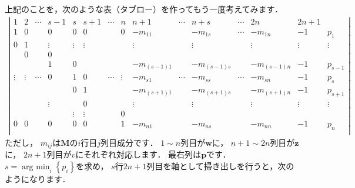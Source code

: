 \documentclass[a4paper]{jsarticle}
\begin{document}
上記のことを，次のような表（タブロー）を作ってもう一度考えてみます．
\begin{align*}
\left|\begin{array}{c|c|c|c|c|c|c|c|c|c|c|c|c|c|c}
1      & 2      & \cdots & s-1    & s      & s+1    & \cdots & n      & n+1       & \cdots & n+s       & \cdots & 2n        & 2n+1   & \\
\hline
1      & 0      &        & 0      & 0      & 0      &        & 0      & -m_{11}    &        & -m_{1s}    & \cdots & -m_{1n}    & -1     & p_{1} \\
0      & 1      &        & \vdots & \vdots & \vdots &        &        & \vdots    &        & \vdots    &        & \vdots    & \vdots & \vdots \\
       & 0      &        & 0      &        &        &        &        &           &        &           &        &           &        &        \\
       &        &        & 1      & 0      &        &        &        & -m_{(s-1)1} &        & -m_{(s-1)s} &        & -m_{(s-1)n} & -1     & p_{s-1} \\
\vdots & \vdots & \cdots & 0      & 1      & 0      & \cdots & \vdots & -m_{s1}    & \cdots & -m_{ss}    & \cdots & -m_{sn}    & -1     & p_{s} \\
       &        &        &        & 0      & 1      &        &        & -m_{(s+1)1} &        & -m_{(s+1)s} &        & -m_{(s+1)n} & -1     & p_{s+1} \\
       &        &        & \vdots &        & 0      &        &        & \vdots    &        & \vdots    &        & \vdots    & \vdots & \vdots \\
       &        &        &        & \vdots & \vdots &        & 0      &           &        &           &        &           &        &        \\
0      & 0      &        & 0      & 0      & 0      &        & 1      & -m_{n1}    &        & -m_{ns}    &        & -m_{nn}    & -1     & p_{n} \\
\end{array}\right|
\end{align*}
ただし，
$m_{ij}$は$\boldsymbol{M}$の$i$行目$j$列目成分です．
$1\sim n$列目が$\boldsymbol{w}$に，
$n+1\sim 2n$列目が$\boldsymbol{z}$に，
$2n+1$列目が$v$にそれぞれ対応します．
最右列は$\boldsymbol{p}$です．
$s=\mathop{\mathrm{arg~min}}_{i}\left\{p_{i}\right\}$を求め，
$s$行$2n+1$列目を軸として掃き出しを行うと，次のようになります．
\end{document}
